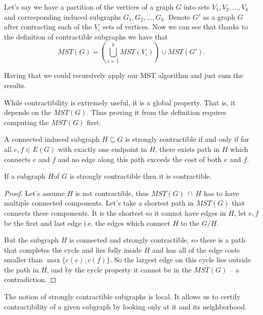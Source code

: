 Let's say we have a partition of the vertices of a graph $G$ into sets {$V_1, V_2, ..., V_k$} and corresponding induced subgraphs {$G_1, G_2, ..., G_k$}. Denote $G'$ as a graph $G$ after contracting each of the $V_i$ sets of vertices. Now we can see that thanks to the definition of contractible subgraphs we have that
\begin{equation}
MST(G) = \left(\bigcup\limits_{i=1}^{k} MST(V_i)\right) \cup MST(G').
\end{equation}
 
Having that we could recursively apply our MST algorithm and just sum the results.

While contractibility is extremely useful, it is a global property. That is, it depends on the $MST(G)$. Thus proving it from the definition requires computing the $MST(G)$ first.

\begin{definition} 
A connected induced subgraph $H \subseteq G$ is strongly contractible if and only if for all $e,f \in E(G)$ with exactly one endpoint in $H$, there exists path in $H$ which connects $e$ and $f$ and no edge along this path exceeds the cost of both $e$ and $f$.
\end{definition}

\begin{lemma}
If a subgraph $H$of $G$ is strongly contractible then it is contractible.    
\end{lemma}

\begin{proof}
Let's assume $H$ is not contractible, thus $MST(G)\ \cap\ H$ has to have multiple connected components. Let's take a shortest path in $MST(G)$ that connects these components. It is the shortest so it cannot have edges in $H$, let $e, f$ be the first and last edge i.e. the edges which connect $H$ to the $G/H$. 

But the subgraph $H$ is connected and strongly contractible, so there is a path that completes the cycle and lies fully inside $H$ and has all of the edge costs smaller than $\max\{c(e), c(f)\}$. So the largest edge on this cycle lies outside the path in $H$, and by the cycle property it cannot be in the $MST(G)$ -- a contradiction.     
\end{proof}

The notion of strongly contractible subgraphs is local. It allows us to certify contractibility of a given subgraph by looking only at it and its neighborhood.

